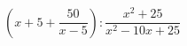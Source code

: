 \begin{ex}[type=expression]
	\begin{condition}
		\(\left( x+5+\dfrac{50}{x-5} \right):\dfrac{x^2+25}{x^2-10x+25}\)
	\end{condition}
\end{ex}